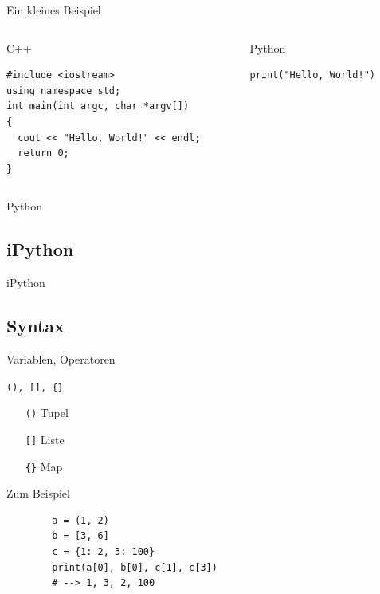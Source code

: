 \begin{frame}[fragile]{Ein kleines Beispiel}
  \vspace{-1em}
  \begin{columns}
    \begin{column}{0.5\textwidth}
      \begin{exampleblock}{C++}
        \begin{verbatim}
#include <iostream>
using namespace std;
int main(int argc, char *argv[])
{
  cout << "Hello, World!" << endl;
  return 0;
}
        \end{verbatim}
      \end{exampleblock}
    \end{column}
    \begin{column}{0.5\textwidth}
      \begin{exampleblock}{Python}
        \begin{verbatim}
print("Hello, World!")
        \end{verbatim}
      \end{exampleblock}
    \end{column}
  \end{columns}
\end{frame}

  \begin{frame}{Python}
    \tableofcontents[sectionstyle=show/hide,
                     subsectionstyle=show/show/hide,
                     subsubsectionstyle=show/show/show]
  \end{frame}

  \subsection{iPython}
    \begin{frame}{iPython}
    \end{frame}

  \subsection{Syntax}
    \begin{frame}{Variablen, Operatoren}
    \end{frame}

\begin{frame}[fragile]{\texttt{(), [], \{\}}}
  \begin{itemize}
    \item[\texttt{()}] Tupel
    \item[\texttt{[]}] Liste
    \item[\texttt{\{\}}] Map 
  \end{itemize}
  \vspace{.5em}
  \begin{spacing}{1.0}
    \begin{exampleblock}{Zum Beispiel}
      \begin{verbatim}
        a = (1, 2)
        b = [3, 6]
        c = {1: 2, 3: 100}
        print(a[0], b[0], c[1], c[3])
        # --> 1, 3, 2, 100
      \end{verbatim}
    \end{exampleblock}
  \end{spacing}
\end{frame}

